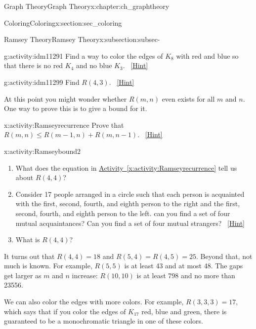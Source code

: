 \documentclass[oneside,10pt,]{book}
\numberwithin{equation}{chapter}
\begin{document}
\begin{chapterptx}{Graph Theory}{}{Graph Theory}{}{}{x:chapter:ch_graphtheory}
\begin{sectionptx}{Coloring}{}{Coloring}{}{}{x:section:sec_coloring}
\begin{subsectionptx}{Ramsey Theory}{}{Ramsey Theory}{}{}{x:subsection:subsec-}
\begin{activity}{}{g:activity:idm11291}
Find a way to color the edges of \(K_8\) with red and blue so that there is no red \(K_4\) and no blue \(K_3\).%
\qquad~\hfill{\tiny\hyperlink{g:hint:idm11297-back}{[Hint]}}\end{activity}
\begin{activity}{}{g:activity:idm11299}%
Find \(R(4,3)\).%
\qquad~\hfill{\tiny\hyperlink{g:hint:idm11303-back}{[Hint]}}\end{activity}
At this point you might wonder whether \(R(m,n)\) even exists for all \(m\) and \(n\).  One way to prove this is to give a bound for it.%
\begin{activity}{}{x:activity:Ramseyrecurrence}%
Prove that \(R(m,n)\le R(m-1,n) + R(m,n-1)\).%
\qquad~\hfill{\tiny\hyperlink{g:hint:idm11318-back}{[Hint]}}\end{activity}
\begin{activity}{}{x:activity:Ramseybound2}%
\begin{enumerate}[font=\bfseries,label=(\alph*),ref=\alph*]
\item{}What does the equation in \hyperref[x:activity:Ramseyrecurrence]{Activity~\ref{x:activity:Ramseyrecurrence}} tell us about \(R(4,4)\)?%
\item{}Consider 17 people arranged in a circle such that each person is acquainted with the first, second, fourth, and eighth person to the right and the first, second, fourth, and eighth person to the left.  can you find a set of four mutual acquaintances?  Can you find a set of four mutual strangers?%
\qquad~\hfill{\tiny\hyperlink{g:hint:idm11362-back}{[Hint]}}\item{}What is \(R(4,4)\)?%
\end{enumerate}
\end{activity}
It turns out that \(R(4,4) = 18\) and \(R(5, 4) = R(4,5) = 25\).  Beyond that, not much is known.  For example, \(R(5,5)\) is at least 43 and at most 48.  The gaps get larger as \(m\) and \(n\) increase: \(R(10,10)\) is at least 798 and no more than 23556.%
\par
We can also color the edges with more colors.  For example, \(R(3,3,3) = 17\), which says that if you color the edges of \(K_{17}\) red, blue and green, there is guaranteed to be a monochromatic triangle in one of these colors.%
\end{subsectionptx}
\end{sectionptx}
%
%
\typeout{************************************************}
\typeout{************************************************}

\end{chapterptx}
\end{document}
